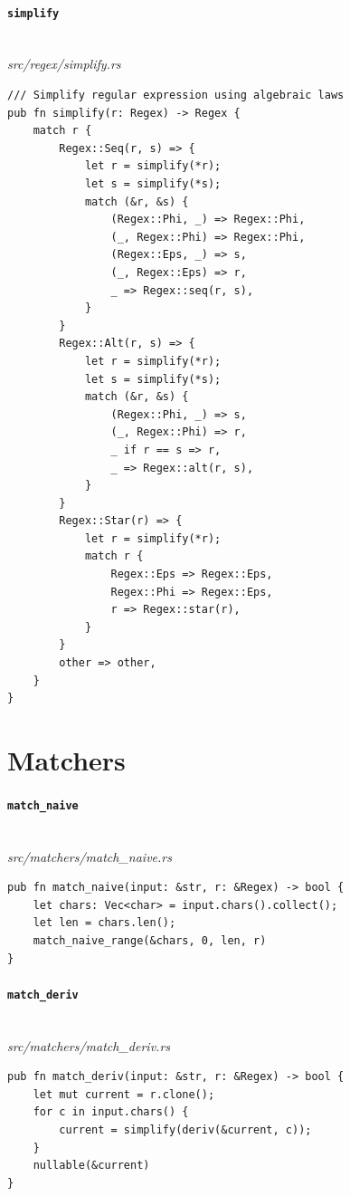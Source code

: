 \paragraph{\texttt{simplify}}\ \\[-0.4em]
\textit{\small src/regex/simplify.rs}
{\scriptsize\begin{verbatim}
/// Simplify regular expression using algebraic laws
pub fn simplify(r: Regex) -> Regex {
    match r {
        Regex::Seq(r, s) => {
            let r = simplify(*r);
            let s = simplify(*s);
            match (&r, &s) {
                (Regex::Phi, _) => Regex::Phi,
                (_, Regex::Phi) => Regex::Phi,
                (Regex::Eps, _) => s,
                (_, Regex::Eps) => r,
                _ => Regex::seq(r, s),
            }
        }
        Regex::Alt(r, s) => {
            let r = simplify(*r);
            let s = simplify(*s);
            match (&r, &s) {
                (Regex::Phi, _) => s,
                (_, Regex::Phi) => r,
                _ if r == s => r,
                _ => Regex::alt(r, s),
            }
        }
        Regex::Star(r) => {
            let r = simplify(*r);
            match r {
                Regex::Eps => Regex::Eps,
                Regex::Phi => Regex::Eps,
                r => Regex::star(r),
            }
        }
        other => other,
    }
}
\end{verbatim}}

\section{Matchers}
\label{app:code-matchers}

\paragraph{\texttt{match\_naive}}\ \\[-0.4em]
\textit{\small src/matchers/match\_naive.rs}
{\scriptsize\begin{verbatim}
pub fn match_naive(input: &str, r: &Regex) -> bool {
    let chars: Vec<char> = input.chars().collect();
    let len = chars.len();
    match_naive_range(&chars, 0, len, r)
}
\end{verbatim}}

\paragraph{\texttt{match\_deriv}}\ \\[-0.4em]
\textit{\small src/matchers/match\_deriv.rs}
{\scriptsize\begin{verbatim}
pub fn match_deriv(input: &str, r: &Regex) -> bool {
    let mut current = r.clone();
    for c in input.chars() {
        current = simplify(deriv(&current, c));
    }
    nullable(&current)
}
\end{verbatim}}

